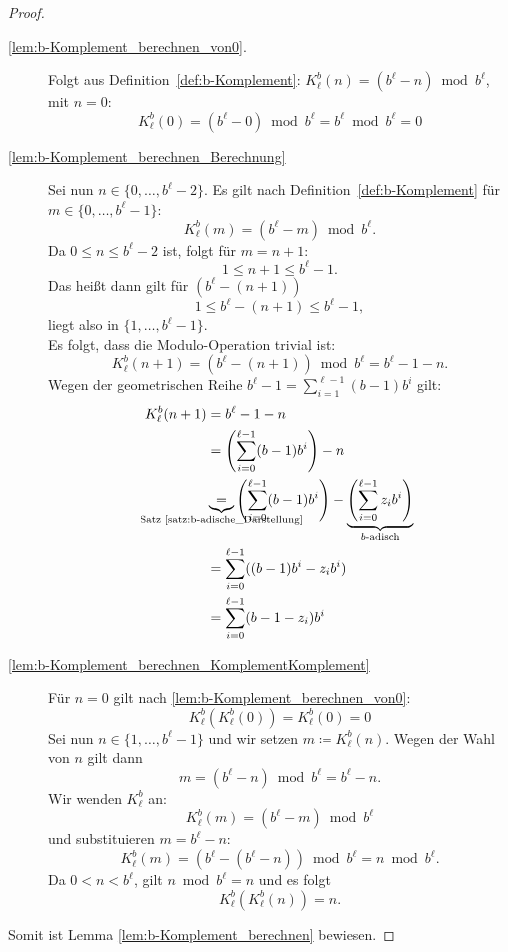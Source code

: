 \documentclass{article}
\begin{document}
    \begin{proof}
      \begin{description}
        \item[\ref{lem:b-Komplement_berechnen_von0}.] Folgt aus Definition~\ref{def:b-Komplement}: $K_\ell^b(n) = (b^\ell-n) \bmod b^\ell$, mit $n=0$:
          \[K_\ell^b(0)=(b^\ell-0) \bmod b^\ell = b^\ell \bmod b^\ell = 0\]
        \item[\ref{lem:b-Komplement_berechnen_Berechnung}] Sei nun $n \in \{0,\dots,b^\ell-2\}$.
          Es gilt nach Definition~\ref{def:b-Komplement} für $m \in \{0, \dots, b^\ell-1\}:$ 
          \[K^b_\ell(m)=(b^\ell-m) \bmod b^\ell.\]
          Da $0 \leq n \leq b^\ell -2$ ist, folgt für $m = n+1$:
          \[1 \leq n+1 \leq b^\ell-1.\]
          Das heißt dann gilt für $(b^\ell - (n+1))$ 
          \[1 \leq b^\ell-(n+1) \leq b^\ell -1,\] 
          liegt also in $\{1, \dots, b^\ell-1\}$.\\
          Es folgt, dass die Modulo-Operation trivial ist:
          \[K^b_\ell(n+1)=(b^\ell-(n+1)) \bmod b^\ell =b^\ell-1-n.\]
          Wegen der geometrischen Reihe $b^\ell-1 = \displaystyle\sum_{i=1}^{\ell-1} (b-1)b^i$ gilt:
          \begin{align*}
            K^b_\ell(n+1) &= b^\ell-1-n \\
            &= \left(\sum_{i=0}^{\ell-1}(b-1)b^i\right) -n \\
          &\underbrace{=}_{\mathclap{\text{Satz \ref{satz:b-adische_Darstellung}}}} \left(\sum_{i=0}^{\ell-1}(b-1)b^i\right) - \underbrace{\left(\sum_{i=0}^{\ell-1} z_ib^i\right)}_{\mathclap{b\text{-adisch}}} \\
            &= \sum_{i=0}^{\ell-1} ((b-1)b^i - z_ib^i) \\
            &= \sum_{i=0}^{\ell-1} (b-1-z_i) b^i
          \end{align*}
        \item[\ref{lem:b-Komplement_berechnen_KomplementKomplement}] Für $n=0$ gilt nach \ref{lem:b-Komplement_berechnen_von0}: 
          \[K^b_\ell(K^b_\ell(0)) = K^b_\ell(0) = 0\]
          Sei nun $n \in \{1, \dots, b^\ell-1\}$ und wir setzen $m \coloneq K_\ell^b(n)$.
          Wegen der Wahl von $n$ gilt dann 
          \[m = (b^\ell-n) \bmod b^\ell = b^\ell-n.\]
          Wir wenden $K_\ell^b$ an:
          \[K_\ell^b(m) = (b^\ell-m) \bmod b^\ell\]
          und substituieren $m=b^\ell-n$:
          \[K_\ell^b(m)=(b^\ell-(b^\ell-n)) \bmod b^\ell = n \bmod b^\ell.\]
          Da $0 < n < b^\ell$, gilt $n \bmod b^\ell = n$ und es folgt
          \[K^b_\ell(K^b_\ell(n))=n.\]
      \end{description}
      Somit ist Lemma \ref{lem:b-Komplement_berechnen} bewiesen.
    \end{proof}
\end{document}
